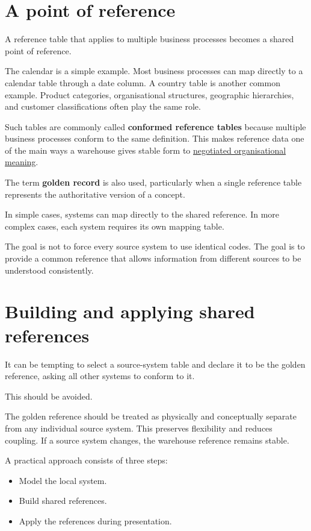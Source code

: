 \documentclass[10pt,openany,10pt]{book}
\providecommand{\tightlist}{%
  \setlength{\itemsep}{0pt}\setlength{\parskip}{0pt}}
\begin{document}
\section{A point of reference}\label{a-point-of-reference}

A reference table that applies to multiple business processes becomes a
shared point of reference.

The calendar is a simple example. Most business processes can map
directly to a calendar table through a date column. A country table is
another common example. Product categories, organisational structures,
geographic hierarchies, and customer classifications often play the same
role.

Such tables are commonly called \textbf{conformed reference tables}
because multiple business processes conform to the same definition. This
makes reference data one of the main ways a warehouse gives stable form
to \hyperref[docs-foundations-data-and-organisations]{negotiated
organisational meaning}.

The term \textbf{golden record} is also used, particularly when a single
reference table represents the authoritative version of a concept.

In simple cases, systems can map directly to the shared reference. In
more complex cases, each system requires its own mapping table.

The goal is not to force every source system to use identical codes. The
goal is to provide a common reference that allows information from
different sources to be understood consistently.

\section{Building and applying shared
references}\label{building-and-applying-shared-references}

It can be tempting to select a source-system table and declare it to be
the golden reference, asking all other systems to conform to it.

This should be avoided.

The golden reference should be treated as physically and conceptually
separate from any individual source system. This preserves flexibility
and reduces coupling. If a source system changes, the warehouse
reference remains stable.

A practical approach consists of three steps:

\begin{itemize}
\tightlist
\item
  Model the local system.
\item
  Build shared references.
\item
  Apply the references during presentation.
\end{itemize}
\end{document}

